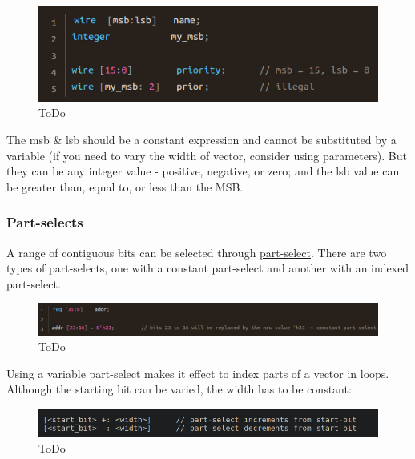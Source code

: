 \documentclass{article}
\begin{document}
	\begin{figure}[H]
		\includegraphics[width=\linewidth]{VerilogPics/figure_15.png}
		\caption{ToDo}
		\label{ToDo}
	\end{figure}

	The msb \& lsb should be a constant expression and cannot be substituted by a variable (if you need to vary the width of vector, consider using parameters). But they can be any integer value -
	positive, negative, or zero; and the lsb value can be greater than, equal to, or less than the MSB.

	\subsubsection{Part-selects}

	A range of contiguous bits can be selected through \underline{part-select}. There are two types of part-selects, one with a constant part-select and another with an indexed part-select. \newline

	\begin{figure}[H]
		\includegraphics[width=\linewidth]{VerilogPics/figure_16.png}
		\caption{ToDo}
		\label{ToDo}
	\end{figure}

	Using a variable part-select makes it effect to index parts of a vector in loops. Although the starting bit can be varied, the width has to be constant:

	\begin{figure}[H]
		\includegraphics[width=\linewidth]{VerilogPics/figure_17.png}
		\caption{ToDo}
		\label{ToDo}
	\end{figure}
\end{document}
